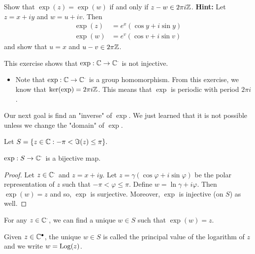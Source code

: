\documentclass[a4paper]{report}
\begin{document}
\begin{prop}
   Show that \( \exp(z) = \exp(w) \) if and only if \( z - w \in 2 \pi i \mathbb{Z}  \). 
   \textbf{Hint:} Let \( z = x + iy \) and \( w = u + i v \). Then 
   \begin{align*}
       \exp(z) &= e^{x} (\cos y + i \sin y) \\
       \exp(w) &= e^{v} (\cos v + i \sin v)
   \end{align*}
   and show that \( u  = x  \) and \(  u - v \in 2 \pi \mathbb{Z}  \).
\end{prop} 

\begin{remark}
    This exercise shows that \( \exp: \mathbb{C} \to \mathbb{C}^{\cdot} \) is not injective.
    \begin{itemize}
        \item Note that \( \exp: \mathbb{C} \to \mathbb{C}^{\cdot} \) is a group homomorphism. From this exercise, we know that \( \ker(\exp) = 2\pi i \mathbb{Z}  \). This means that \( \exp  \) is periodic with period \( 2 \pi i  \). 
    \end{itemize}
\end{remark}

Our next goal is find an "inverse" of \( \exp \). We just learned that it is not possible unless we change the "domain" of \( \exp \).

Let \( S = \{ z \in \mathbb{C} : -\pi < \Im(z) \leq \pi \}. \)

\begin{lemma}
   \( \exp: S \to \mathbb{C}^{\cdot} \) is a bijective map. 
\end{lemma}
\begin{proof}
Let \( z \in \mathbb{C}^{\cdot} \) and \( z = x + iy \). Let \( z = \gamma (\cos \varphi + i \sin \varphi) \) be the polar representation of \( z  \) such that \( -\pi < \varphi \leq \pi \). Define \( w = \ln \gamma + i \varphi \). Then \( \exp(w) = z  \) and so, \( \exp  \) is surjective. Moreover, \( \exp  \) is injective (on \( S \)) as well.
\end{proof}

\begin{corollary}
    For any \( z \in \mathbb{C}^{\cdot} \), we can find a unique \( w \in S  \) such that \( \exp(w) = z \).
\end{corollary}

\begin{definition}[ ]
    Given \( z \in \mathbb{C}^{\bullet} \), the unique \( w \in S  \) is called the principal value of the logarithm of \( z  \) and we write \( w = \operatorname{Log}(z) \).
\end{definition}
\end{document}

